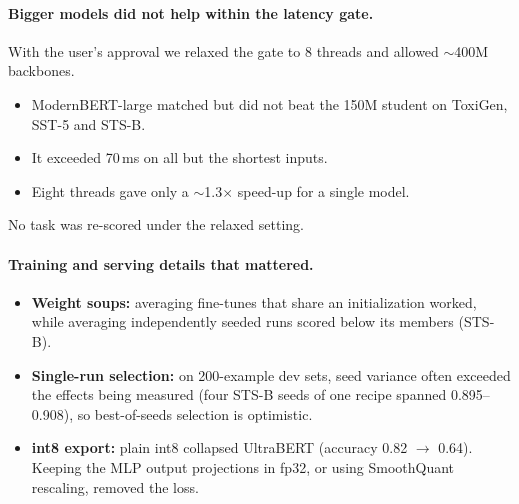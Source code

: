 \documentclass[11pt]{article}
\begin{document}
\paragraph{Bigger models did not help within the latency gate.}
With the user's approval we relaxed the gate to 8 threads and allowed $\sim$400M backbones.
\begin{itemize}
  \item ModernBERT-large \citep{warner2024modernbert} matched but did not beat the 150M student on ToxiGen, SST-5 and STS-B.
  \item It exceeded 70\,ms on all but the shortest inputs.
  \item Eight threads gave only a $\sim$1.3$\times$ speed-up for a single model.
\end{itemize}
No task was re-scored under the relaxed setting.

\paragraph{Training and serving details that mattered.}
\begin{itemize}
  \item \textbf{Weight soups:} averaging fine-tunes that share an initialization worked, while averaging independently seeded runs scored below its members (STS-B).
  \item \textbf{Single-run selection:} on 200-example dev sets, seed variance often exceeded the effects being measured (four STS-B seeds of one recipe spanned 0.895--0.908), so best-of-seeds selection is optimistic.
  \item \textbf{int8 export:} plain int8 collapsed UltraBERT (accuracy 0.82 $\to$ 0.64). Keeping the MLP output projections in fp32, or using SmoothQuant rescaling, removed the loss.
\end{itemize}
\end{document}
